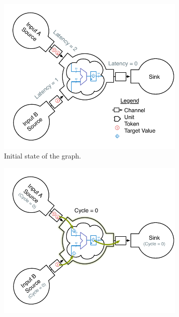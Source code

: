 \begin{figure}
    \centering
    \begin{subfigure}[t]{0.45\textwidth}
        \captionsetup{margin=0.25cm}
        \includegraphics[width=\columnwidth]{figures/adder-example1.pdf}
        \caption{Initial state of the graph.}
    \end{subfigure}
    \begin{subfigure}[t]{0.45\textwidth}
        \captionsetup{margin=0.25cm}
        \includegraphics[width=\columnwidth]{figures/adder-example2.pdf}

\end{subfigure}
\end{figure}

